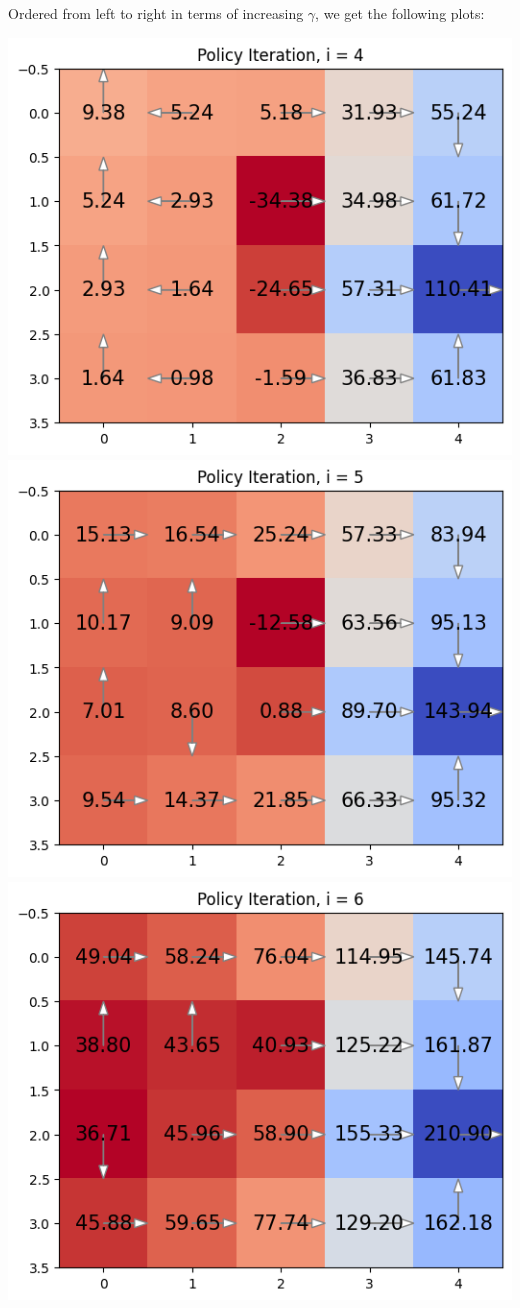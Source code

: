 \documentclass[expanded]{lkx_pset}
\begin{document}
\begin{solution}
	Ordered from left to right in terms of increasing $\gamma$, we get the following plots:
	\begin{center}
		\includegraphics[scale=0.5]{figures/4-1.png}
		\includegraphics[scale=0.5]{figures/4-2.png}
		\includegraphics[scale=0.5]{figures/4-3.png}

\end{center}
\end{solution}
\end{document}
